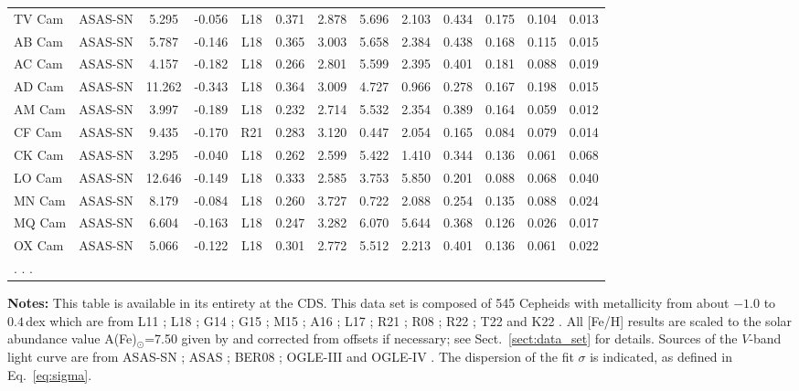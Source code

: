 \documentclass[article]{aa} %
\begin{document}
\begin{appendix}
\begin{longtable}{llSSccccccccc}
TV Cam & ASAS-SN& 5.295 & -0.056&L18& 0.371&2.878&5.696 & 2.103 & 0.434 & 0.175 & 0.104&0.013\\
AB Cam & ASAS-SN& 5.787 & -0.146&L18& 0.365&3.003&5.658 & 2.384 & 0.438 & 0.168 & 0.115&0.015\\
AC Cam & ASAS-SN& 4.157 & -0.182&L18& 0.266&2.801&5.599 & 2.395 & 0.401 & 0.181 & 0.088&0.019\\
AD Cam & ASAS-SN& 11.262 & -0.343&L18& 0.364&3.009&4.727 & 0.966 & 0.278 & 0.167 & 0.198&0.015\\
AM Cam & ASAS-SN& 3.997 & -0.189&L18& 0.232&2.714&5.532 & 2.354 & 0.389 & 0.164 & 0.059&0.012\\
CF Cam & ASAS-SN& 9.435 & -0.170&R21& 0.283&3.120&0.447 & 2.054 & 0.165 & 0.084 & 0.079&0.014\\
CK Cam & ASAS-SN& 3.295 & -0.040&L18& 0.262&2.599&5.422 & 1.410 & 0.344 & 0.136 & 0.061&0.068\\
LO Cam & ASAS-SN& 12.646 & -0.149&L18& 0.333&2.585&3.753 & 5.850 & 0.201 & 0.088 & 0.068&0.040\\
MN Cam & ASAS-SN& 8.179 & -0.084&L18& 0.260&3.727&0.722 & 2.088 & 0.254 & 0.135 & 0.088&0.024\\
MQ Cam & ASAS-SN& 6.604 & -0.163&L18& 0.247&3.282&6.070 & 5.644 & 0.368 & 0.126 & 0.026&0.017\\
OX Cam & ASAS-SN& 5.066 & -0.122&L18& 0.301&2.772&5.512 & 2.213 & 0.401 & 0.136 & 0.061&0.022\\

. . .  &  &  &  & &  &  &  & &  &  &  & \\





\end{longtable}


    \begin{tablenotes}
      \item \textbf{Notes:} This table is available in its entirety at the CDS. This data set is composed of 545 Cepheids with metallicity from about $-1.0$ to $0.4\,$dex which are from L11 \citep{luck11}; L18 \citep{Luck2018}; G14 \citep{Genovali2014}; G15 \citep{Genovali2015}; M15 \citep{Martin2015}; A16 \citep{Andrievsky2016}; L17 \cite{Lemasle2017}; R21 \citep{Ripepi2021}; R08 \citep{Romaniello2008}; R22 \citep{Romaniello2022}; T22 \citep{Trentin2023} and K22 \citep{Kovtyukh2022}. All [Fe/H] results are scaled to the solar abundance value A(Fe)$_\odot$=7.50 given by \cite{Asplund2009} and corrected from offsets if necessary; see Sect.~\ref{sect:data_set} for details. Sources of the $V$-band light curve are from ASAS-SN \citep{ASAS2018}; ASAS \citep{Pojmanski2002}; BER08 \citep{Berdnikov2008}; OGLE-III and OGLE-IV \citep{Soszynski2008,Soszynski2010}. The dispersion of the fit $\sigma$ is indicated, as defined in Eq.~\ref{eq:sigma}.
    \end{tablenotes}




\end{appendix}
\end{document}
